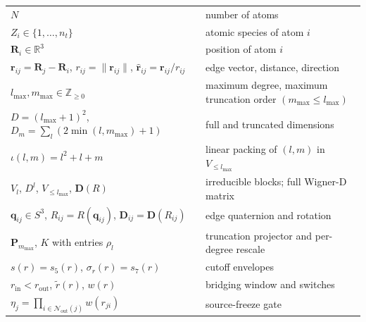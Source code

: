 \documentclass[11pt,a4paper]{article}
\newcommand{\R}{\mathbb{R}}
\newcommand{\Z}{\mathbb{Z}}
\newcommand{\bR}{\bm{R}}
\newcommand{\br}{\bm{r}}
\newcommand{\brh}{\hat{\bm{r}}}
\newcommand{\bq}{\bm{q}}
\newcommand{\bD}{\bm{D}}
\newcommand{\bP}{\bm{P}}
\newcommand{\rin}{r_{\mathrm{in}}}
\newcommand{\rout}{r_{\mathrm{out}}}
\newcommand{\lmax}{l_{\max}}
\newcommand{\mmax}{m_{\max}}
\newcommand{\rtilde}{\widetilde{r}}
\newcommand{\Nb}{\mathcal{N}}
\theoremstyle{plain}
\theoremstyle{definition}
\theoremstyle{remark}
\begin{document}
\begin{tabular}{ll}
    $N$                                                                                                & number of atoms                                             \\
    $Z_i\in\{1,\dots,n_t\}$                                                                            & atomic species of atom $i$                                  \\
    $\bR_i\in\R^3$                                                                                     & position of atom $i$                                        \\
    $\br_{ij}=\bR_j-\bR_i$, $r_{ij}=\|\br_{ij}\|$, $\brh_{ij}=\br_{ij}/r_{ij}$                         & edge vector, distance, direction                            \\
    $\lmax,\mmax\in\Z_{\geq 0}$                                                                        & maximum degree, maximum truncation order $(\mmax\leq\lmax)$ \\
    $D=(\lmax+1)^2$, $D_m=\sum_l(2\min(l,\mmax)+1)$                                                    & full and truncated dimensions                               \\
    $\iota(l,m)=l^2+l+m$                                                                               & linear packing of $(l,m)$ in $V_{\le\lmax}$                 \\
    $V_l$, $D^l$, $V_{\le\lmax}$, $\bD(R)$                                                             & irreducible blocks; full Wigner-D matrix                    \\
    $\bq_{ij}\in S^3$, $R_{ij}=R(\bq_{ij})$, $\bD_{ij}=\bD(R_{ij})$                                    & edge quaternion and rotation                                \\
    $\bP_{\mmax}$, $K$ with entries $\rho_l$                                                           & truncation projector and per-degree rescale                 \\
    $s(r)=s_5(r)$, $\sigma_r(r)=s_7(r)$                                                                & cutoff envelopes                                            \\
    $\rin<\rout$, $\rtilde(r)$, $w(r)$                                                                 & bridging window and switches                                \\
    $\eta_j=\prod_{i\in\Nb_{\mathrm{out}}(j)} w(r_{ji})$                                               & source-freeze gate                                          \\

\end{tabular}
\end{document}
